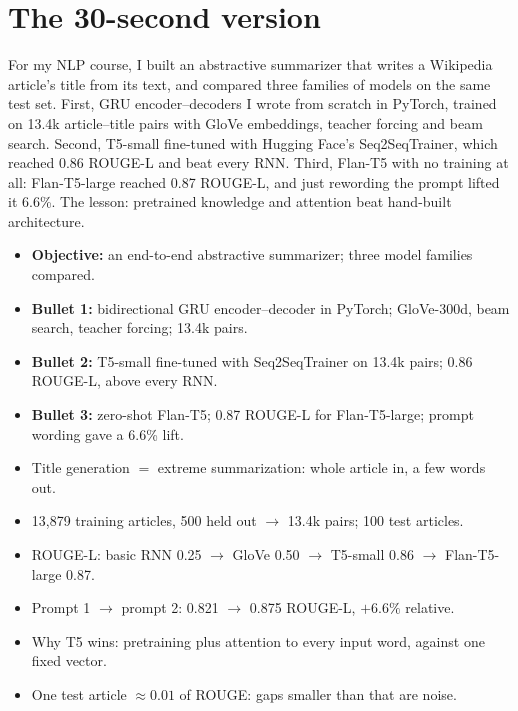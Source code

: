 \chapter{The 30-second version}
\label{ch:thirty}

\begin{sayit}
For my NLP course, I built an abstractive summarizer that writes a Wikipedia article's title from its text, and compared three families of models on the same test set. First, GRU encoder--decoders I wrote from scratch in PyTorch, trained on 13.4k article--title pairs with GloVe embeddings, teacher forcing and beam search. Second, T5-small fine-tuned with Hugging Face's Seq2SeqTrainer, which reached 0.86 ROUGE-L and beat every RNN. Third, Flan-T5 with no training at all: Flan-T5-large reached 0.87 ROUGE-L, and just rewording the prompt lifted it 6.6\%. The lesson: pretrained knowledge and attention beat hand-built architecture.
\end{sayit}

\begin{sayit}
\begin{itemize}
  \item \textbf{Objective:} an end-to-end abstractive summarizer; three model families compared.
  \item \textbf{Bullet 1:} bidirectional GRU encoder--decoder in PyTorch; GloVe-300d, beam search, teacher forcing; 13.4k pairs.
  \item \textbf{Bullet 2:} T5-small fine-tuned with Seq2SeqTrainer on 13.4k pairs; 0.86 ROUGE-L, above every RNN.
  \item \textbf{Bullet 3:} zero-shot Flan-T5; 0.87 ROUGE-L for Flan-T5-large; prompt wording gave a 6.6\% lift.
\end{itemize}
\end{sayit}

\begin{sayit}
\begin{itemize}
  \item Title generation $=$ extreme summarization: whole article in, a few words out.
  \item 13,879 training articles, 500 held out $\to$ 13.4k pairs; 100 test articles.
  \item ROUGE-L: basic RNN 0.25 $\to$ GloVe 0.50 $\to$ T5-small 0.86 $\to$ Flan-T5-large 0.87.
  \item Prompt 1 $\to$ prompt 2: 0.821 $\to$ 0.875 ROUGE-L, $+6.6\%$ relative.
  \item Why T5 wins: pretraining plus attention to every input word, against one fixed vector.
  \item One test article $\approx 0.01$ of ROUGE: gaps smaller than that are noise.
\end{itemize}
\end{sayit}
